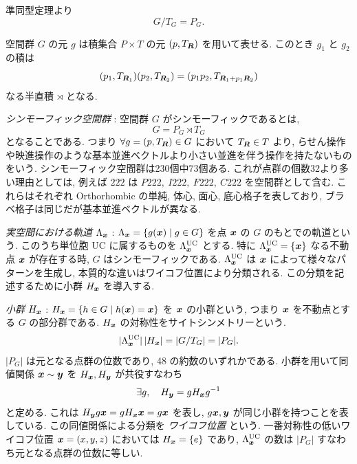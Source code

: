 準同型定理より
\begin{equation}
 G / T_G = P_G.
\end{equation}

空間群 $G$ の元 $g$ は積集合 $P \times T$ の元 $(p, T_{\bm{R}})$ を用いて表せる. このとき $g_1$ と $g_2$ の積は
\begin{equation}
 (p_1, T_{\bm{R}_1}) (p_2, T_{\bm{R}_2}) = (p_1 p_2, T_{\bm{R}_1 + p_1 \bm{R}_2})
\end{equation}
なる半直積 $\rtimes$ となる.

\emph{シンモーフィック空間群} : 空間群 $G$ がシンモーフィックであるとは,
\begin{equation}
 G = P_G \rtimes T_G
\end{equation}
となることである. つまり $\forall g = (p, T_{\bm{R}}) \in G$ において $T_{\bm{R}} \in T$ より, らせん操作や映進操作のような基本並進ベクトルより小さい並進を伴う操作を持たないものをいう.
シンモーフィック空間群は230個中73個ある. これが点群の個数32より多い理由としては, 例えば $222$ は $P222,\ I222,\ F222,\ C222$ を空間群として含む. これらはそれぞれ Orthorhombic の単純, 体心, 面心, 底心格子を表しており, ブラベ格子は同じだが基本並進ベクトルが異なる.

\emph{実空間における軌道} $\Lambda_{\bm{x}}$ : $\Lambda_{\bm{x}} = \{ g(\bm{x}) \mid g \in G \}$ を点 $\bm{x}$ の $G$ のもとでの軌道という. このうち単位胞 UC に属するものを $\Lambda_{\bm{x}}^{\mathrm{UC}}$ とする. 特に $\Lambda_{\bm{x}}^{\mathrm{UC}} = \{ \bm{x} \}$ なる不動点 $\bm{x}$ が存在する時, $G$ はシンモーフィックである. $\Lambda_{\bm{x}}^{\mathrm{UC}}$ は $\bm{x}$ によって様々なパターンを生成し, 本質的な違いはワイコフ位置により分類される. この分類を記述するために小群 $H_{\bm{x}}$ を導入する.

\emph{小群} $H_{\bm{x}}$ : $H_{\bm{x}} = \{ h \in G \mid h(\bm{x}) = \bm{x} \}$ を $\bm{x}$ の小群という, つまり $\bm{x}$ を不動点とする $G$ の部分群である. $H_{\bm{x}}$ の対称性をサイトシンメトリーという.
\begin{equation}
 |\Lambda_{\bm{x}}^{\mathrm{UC}}|\,|H_{\bm{x}}| = |G / T_G| = |P_G|.
\end{equation}
$|P_G|$ は元となる点群の位数であり, 48 の約数のいずれかである. 小群を用いて同値関係 $\bm{x} \sim \bm{y}$ を $H_{\bm{x}}, H_{\bm{y}}$ が共役すなわち
\begin{equation}
 \exists g, \quad H_{\bm{y}} = g H_{\bm{x}} g^{-1}
\end{equation}
と定める. これは $H_{\bm{y}} g \bm{x} = g H_{\bm{x}} \bm{x} = g \bm{x}$ を表し, $g \bm{x}, \bm{y}$ が同じ小群を持つことを表している. この同値関係による分類を \emph{ワイコフ位置} という. 一番対称性の低いワイコフ位置 $\bm{x} = (x,y,z)$ においては $H_{\bm{x}} = \{ e \}$ であり, $\Lambda_{\bm{x}}^{\mathrm{UC}}$ の数は $|P_G|$ すなわち元となる点群の位数に等しい.
